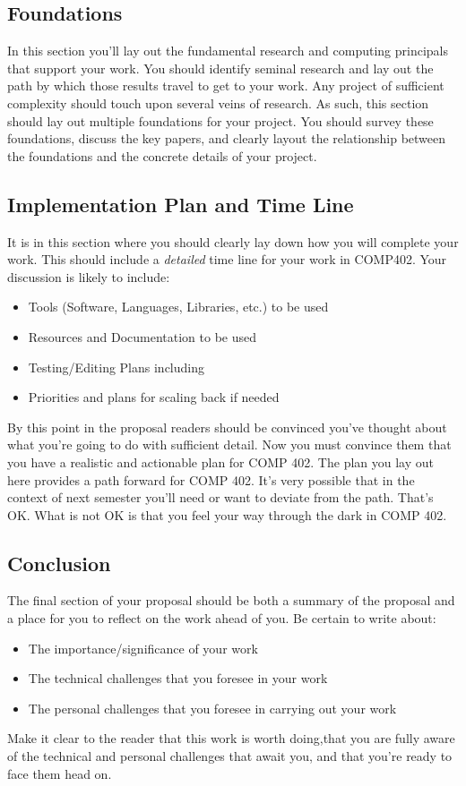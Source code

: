 \documentclass[10pt]{article}
\begin{document}
\subsection{Foundations}

In this section you'll lay out the fundamental research and computing principals that support your work. You should identify seminal research and lay out the path by which those results travel to get to your work. Any project of sufficient complexity should touch upon several veins of research. As such, this section should lay out multiple foundations for your project. You should survey these foundations, discuss the key papers, and clearly layout the relationship between the foundations and the concrete details of your project. 

\subsection{Implementation Plan and Time Line}

It is in this section where you should clearly lay down how you will complete your work. This should include a \textit{detailed} time line for your work in COMP402. Your discussion is likely to include:
\begin{itemize} 
\item Tools (Software, Languages, Libraries, etc.) to be used
\item Resources and Documentation to be used
\item Testing/Editing Plans including 
\item Priorities and plans for scaling back if needed
\end{itemize}
By this point in the proposal readers should be convinced you've thought about what you're going to do with sufficient detail. Now you must convince them that you have a realistic and actionable plan for COMP 402. The plan you lay out here provides a path forward for COMP 402. It's very possible that in the context of next semester you'll need or want to deviate from the path. That's OK. What is not OK is that you feel your way through the dark in COMP 402. 


\subsection{Conclusion}

The final section of your proposal should be both a summary of the proposal and a place for you to reflect on the work ahead of you.  Be certain to write about:
\begin{itemize}
\item The importance/significance of your work
\item The technical challenges that you foresee in your work
\item The personal challenges that you foresee in carrying out your work
\end{itemize}
Make it clear to the reader that this work is worth doing,that you are fully aware of the technical and personal challenges that await you, and that you're ready to face them head on. 
\end{document}
